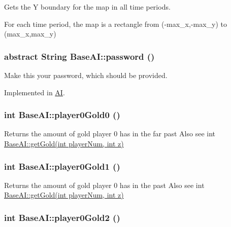 Gets the Y boundary for the map in all time periods.

For each time period, the map is a rectangle from (-max\_\-x,-max\_\-y) to (max\_\-x,max\_\-y) \hypertarget{classBaseAI_8607533e2b5bd9920ded593ae6509f48}{
\subsubsection[{password}]{\setlength{\rightskip}{0pt plus 5cm}abstract String BaseAI::password ()}}
\label{classBaseAI_8607533e2b5bd9920ded593ae6509f48}


Make this your password, which should be provided. 

Implemented in \hyperlink{classAI_405047fd39e03de993183392a06d655b}{AI}.\hypertarget{classBaseAI_e350c70cf7c368175a418a8fd8c29eba}{
\subsubsection[{player0Gold0}]{\setlength{\rightskip}{0pt plus 5cm}int BaseAI::player0Gold0 ()}}
\label{classBaseAI_e350c70cf7c368175a418a8fd8c29eba}


Returns the amount of gold player 0 has in the far past Also see int \hyperlink{classBaseAI_c079405ee4fd5cec789af0f627d3d175}{BaseAI::getGold(int playerNum, int z)} \hypertarget{classBaseAI_55de649fba1edb2c8a316070a4041f16}{
\subsubsection[{player0Gold1}]{\setlength{\rightskip}{0pt plus 5cm}int BaseAI::player0Gold1 ()}}
\label{classBaseAI_55de649fba1edb2c8a316070a4041f16}


Returns the amount of gold player 0 has in the past Also see int \hyperlink{classBaseAI_c079405ee4fd5cec789af0f627d3d175}{BaseAI::getGold(int playerNum, int z)} \hypertarget{classBaseAI_5ea60d2c86f1e4457bef7963a3d0afce}{
\subsubsection[{player0Gold2}]{\setlength{\rightskip}{0pt plus 5cm}int BaseAI::player0Gold2 ()}}
\label{classBaseAI_5ea60d2c86f1e4457bef7963a3d0afce}



